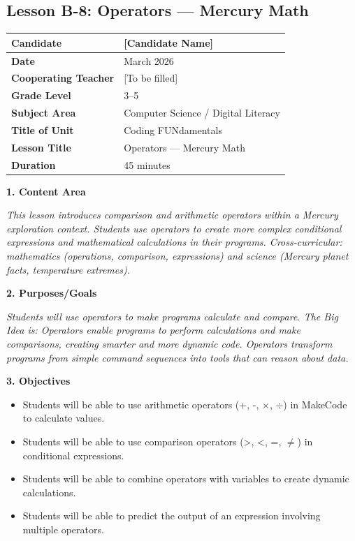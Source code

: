 \documentclass[11pt,letterpaper]{article}
\begin{document}
\newpage
\subsection{Lesson B-8: Operators --- Mercury Math}
\label{sub:LessonB8OperatorsMercuryMath}

\begin{longtable}{|L{0.28\textwidth}|L{0.65\textwidth}|}
\hline
\textbf{Candidate}  & [Candidate Name]  \\
\hline
\textbf{Date}  & March 2026  \\
\hline
\textbf{Cooperating Teacher}  & [To be filled]  \\
\hline
\textbf{Grade Level}  & 3--5  \\
\hline
\textbf{Subject Area}  & Computer Science / Digital Literacy  \\
\hline
\textbf{Title of Unit}  & Coding FUNdamentals  \\
\hline
\textbf{Lesson Title}  & Operators --- Mercury Math  \\
\hline
\textbf{Duration}  & 45 minutes  \\
\hline
\end{longtable}

\textbf{1. Content Area}

\textit{This lesson introduces comparison and arithmetic operators within a Mercury exploration context. Students use operators to create more complex conditional expressions and mathematical calculations in their programs. Cross-curricular: mathematics (operations, comparison, expressions) and science (Mercury planet facts, temperature extremes).}

\textbf{2. Purposes/Goals}

\textit{Students will use operators to make programs calculate and compare. The Big Idea is: Operators enable programs to perform calculations and make comparisons, creating smarter and more dynamic code. Operators transform programs from simple command sequences into tools that can reason about data.}

\textbf{3. Objectives}

\begin{itemize}
  \item Students will be able to use arithmetic operators (+, -, $\times$, \ensuremath{\div}) in MakeCode to calculate values.

  \item Students will be able to use comparison operators (>, <, =, \ensuremath{\neq}) in conditional expressions.

  \item Students will be able to combine operators with variables to create dynamic calculations.

  \item Students will be able to predict the output of an expression involving multiple operators.
\end{itemize}
\end{document}
